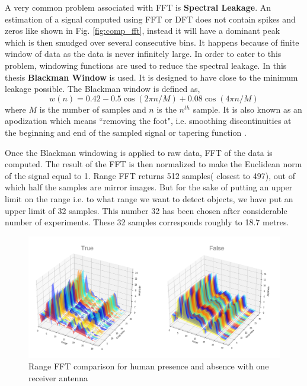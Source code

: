 A very common problem associated with FFT is \textbf{Spectral Leakage}. An estimation of a signal computed using FFT or DFT does not contain spikes and zeros like shown in Fig. \ref{fig:comp_fft}, instead it will have a dominant peak which is then smudged over several consecutive bins. It happens because of finite window of data as the data is never infinitely large. In order to cater to this problem, windowing functions are used to reduce the spectral leakage. In this thesis \textbf{Blackman Window} is used. It is designed to have close to the minimum leakage possible. The Blackman window is defined as,
\begin{equation*}
    w(n) = 0.42 - 0.5\cos(2\pi n/M) + 0.08\cos(4\pi n/M)
\end{equation*}
where \(M\) is the number of samples and \(n\) is the $n^{th}$ sample. It is also known as an apodization which means ``removing the foot", i.e. smoothing discontinuities at the beginning and end of the sampled signal or tapering function \cite{blackman1958measurement}\cite{oppenheim2010discrete}.

Once the Blackman windowing is applied to raw data, FFT of the data is computed. The result of the FFT is then normalized to make the Euclidean norm of the signal equal to 1. Range FFT returns 512 samples( closest to 497), out of which half the samples are mirror images. But for the sake of putting an upper limit on the range i.e. to what range we want to detect objects, we have put an upper limit of 32 samples. This number 32 has been chosen after considerable number of experiments. These 32 samples corresponds roughly to 18.7 metres. 
\begin{figure}[ht]
  \begin{center}
    \includegraphics[width=1\textwidth]{Master's thesis/images/fft_p_a.PNG} 
    \caption{Range FFT comparison for human presence and absence with one receiver antenna}
    \label{fig:FFT_3d1a}
  \end{center}
\end{figure} 



